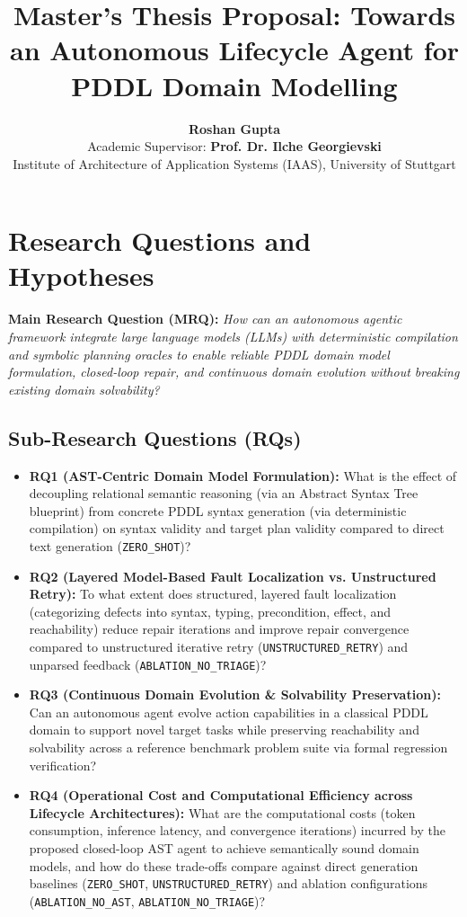 \documentclass[11pt,a4paper]{article}
\title{\vspace{-1.5em}\Large\textbf{Master's Thesis Proposal: Towards an Autonomous Lifecycle Agent for PDDL Domain Modelling}\vspace{-0.5em}}
\author{\textbf{Roshan Gupta}\\
\quad Academic Supervisor: \textbf{Prof. Dr. Ilche Georgievski}\\
Institute of Architecture of Application Systems (IAAS), University of Stuttgart\vspace{-1.0em}}
\date{}
\begin{document}
\maketitle

\section{Research Questions and Hypotheses}
\textbf{Main Research Question (MRQ):} \textit{How can an autonomous agentic framework integrate large language models (LLMs) with deterministic compilation and symbolic planning oracles to enable reliable PDDL domain model formulation, closed-loop repair, and continuous domain evolution without breaking existing domain solvability?}

\subsection{Sub-Research Questions (RQs)}
\begin{itemize}[nosep, leftmargin=1.5em]
    \item \textbf{RQ1 (AST-Centric Domain Model Formulation):} What is the effect of decoupling relational semantic reasoning (via an Abstract Syntax Tree blueprint) from concrete PDDL syntax generation (via deterministic compilation) on syntax validity and target plan validity compared to direct text generation (\texttt{ZERO\_SHOT})?
    \item \textbf{RQ2 (Layered Model-Based Fault Localization vs. Unstructured Retry):} To what extent does structured, layered fault localization (categorizing defects into syntax, typing, precondition, effect, and reachability) reduce repair iterations and improve repair convergence compared to unstructured iterative retry (\texttt{UNSTRUCTURED\_RETRY}) and unparsed feedback (\texttt{ABLATION\_NO\_TRIAGE})?
    \item \textbf{RQ3 (Continuous Domain Evolution \& Solvability Preservation):} Can an autonomous agent evolve action capabilities in a classical PDDL domain to support novel target tasks while preserving reachability and solvability across a reference benchmark problem suite via formal regression verification?
    \item \textbf{RQ4 (Operational Cost and Computational Efficiency across Lifecycle Architectures):} What are the computational costs (token consumption, inference latency, and convergence iterations) incurred by the proposed closed-loop AST agent to achieve semantically sound domain models, and how do these trade-offs compare against direct generation baselines (\texttt{ZERO\_SHOT}, \texttt{UNSTRUCTURED\_RETRY}) and ablation configurations (\texttt{ABLATION\_NO\_AST}, \texttt{ABLATION\_NO\_TRIAGE})?
\end{itemize}
\end{document}
